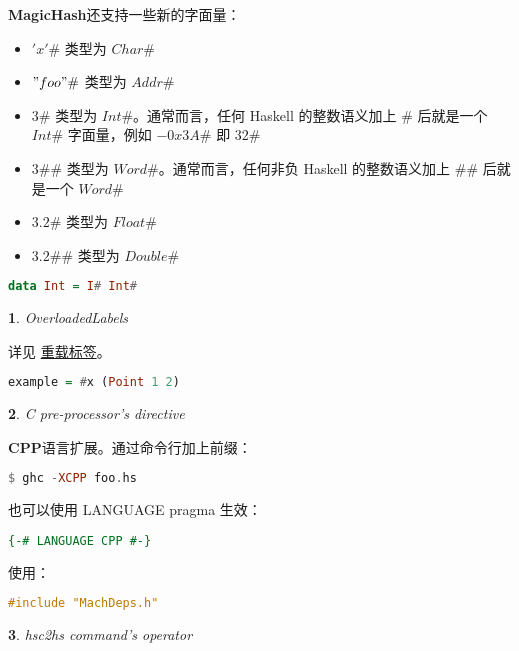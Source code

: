 \documentclass[UTF8]{ctexart}
\theoremstyle{sybs}
\newtheorem{syb}{}
\begin{document}
\textbf{MagicHash}还支持一些新的字面量：

\begin{itemize}
  \item $'x'\#$ 类型为 $Char\#$
  \item $"foo"\#$ 类型为 $Addr\#$
  \item $3\#$ 类型为 $Int\#$。通常而言，任何 Haskell 的整数语义加上 $\#$ 后就是一个 $Int\#$ 字面量，例如 $-0x3A\#$ 即 $32\#$
  \item $3\#\#$ 类型为 $Word\#$。通常而言，任何非负 Haskell 的整数语义加上 $\#\#$ 后就是一个 $Word\#$
  \item $3.2\#$ 类型为 $Float\#$
  \item $3.2\#\#$ 类型为 $Double\#$
\end{itemize}


\begin{lstlisting}[language=Haskell]
  data Int = I# Int#
\end{lstlisting}

\begin{syb}
  \acode{\#} OverloadedLabels
\end{syb}

详见
\href{https://downloads.haskell.org/ghc/latest/docs/users_guide/exts/overloaded_labels.html#overloaded-labels}{重载标签}。

\begin{lstlisting}[language=Haskell]
  example = #x (Point 1 2)
\end{lstlisting}

\begin{syb}
  \acode{\#} C pre-processor's directive
\end{syb}

\textbf{CPP}语言扩展。通过命令行加上前缀：

\begin{lstlisting}[language=Haskell]
  $ ghc -XCPP foo.hs
\end{lstlisting}

也可以使用 LANGUAGE pragma 生效：

\begin{lstlisting}[language=Haskell]
  {-# LANGUAGE CPP #-}
\end{lstlisting}

使用：

\begin{lstlisting}[language=Haskell]
  #include "MachDeps.h"
\end{lstlisting}

\begin{syb}
  \acode{\#} hsc2hs command's operator
\end{syb}
\end{document}
